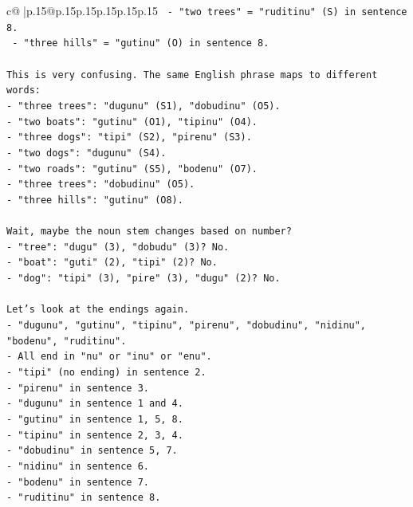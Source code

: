 \documentclass{article}
\begin{document}
{\begin{supertabular}{c@{$\;$}|p{.15\linewidth}@{}p{.15\linewidth}p{.15\linewidth}p{.15\linewidth}p{.15\linewidth}p{.15\linewidth}}
{{{\texttt{  {-} "two trees" = "ruditinu" (S) in sentence 8.} \\
\texttt{  {-} "three hills" = "gutinu" (O) in sentence 8.} \\
\\ 
\texttt{This is very confusing. The same English phrase maps to different words:} \\
\texttt{{-} "three trees": "dugunu" (S1), "dobudinu" (O5).} \\
\texttt{{-} "two boats": "gutinu" (O1), "tipinu" (O4).} \\
\texttt{{-} "three dogs": "tipi" (S2), "pirenu" (S3).} \\
\texttt{{-} "two dogs": "dugunu" (S4).} \\
\texttt{{-} "two roads": "gutinu" (S5), "bodenu" (O7).} \\
\texttt{{-} "three trees": "dobudinu" (O5).} \\
\texttt{{-} "three hills": "gutinu" (O8).} \\
\\ 
\texttt{Wait, maybe the noun stem changes based on number?} \\
\texttt{{-} "tree": "dugu" (3), "dobudu" (3)? No.} \\
\texttt{{-} "boat": "guti" (2), "tipi" (2)? No.} \\
\texttt{{-} "dog": "tipi" (3), "pire" (3), "dugu" (2)? No.} \\
\\ 
\texttt{Let's look at the endings again.} \\
\texttt{{-} "dugunu", "gutinu", "tipinu", "pirenu", "dobudinu", "nidinu", "bodenu", "ruditinu".} \\
\texttt{{-} All end in "nu" or "inu" or "enu".} \\
\texttt{{-} "tipi" (no ending) in sentence 2.} \\
\texttt{{-} "pirenu" in sentence 3.} \\
\texttt{{-} "dugunu" in sentence 1 and 4.} \\
\texttt{{-} "gutinu" in sentence 1, 5, 8.} \\
\texttt{{-} "tipinu" in sentence 2, 3, 4.} \\
\texttt{{-} "dobudinu" in sentence 5, 7.} \\
\texttt{{-} "nidinu" in sentence 6.} \\
\texttt{{-} "bodenu" in sentence 7.} \\
\texttt{{-} "ruditinu" in sentence 8.} \\
\\ 
}}}
\end{supertabular}}
\end{document}
